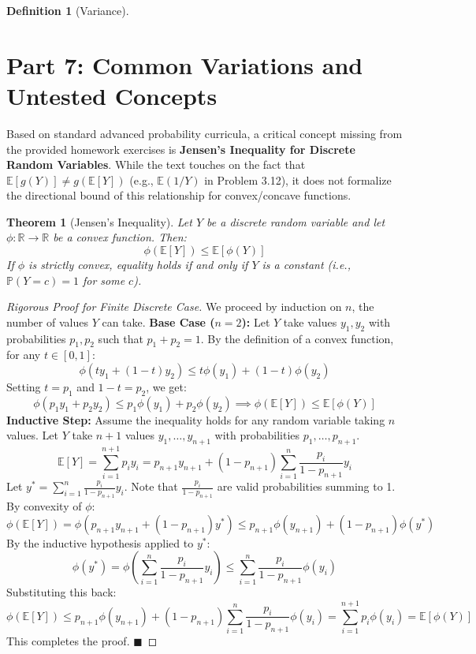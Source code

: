 \documentclass[11pt,letterpaper]{article}
\theoremstyle{definition}
\newtheorem{definition}{Definition}[section]
\theoremstyle{plain}
\newtheorem{theorem}{Theorem}[section]
\theoremstyle{remark}
\newcommand{\E}{\mathbb{E}}
\newcommand{\R}{\mathbb{R}}
\newcommand{\Prob}{\mathbb{P}}
\begin{document}
\begin{definition}[Variance]
\newpage
\section{Part 7: Common Variations and Untested Concepts}

Based on standard advanced probability curricula, a critical concept missing from the provided homework exercises is \textbf{Jensen's Inequality for Discrete Random Variables}. While the text touches on the fact that $\E[g(Y)] \neq g(\E[Y])$ (e.g., $\E(1/Y)$ in Problem 3.12), it does not formalize the directional bound of this relationship for convex/concave functions.

\begin{theorem}[Jensen's Inequality]
Let $Y$ be a discrete random variable and let $\phi: \R \to \R$ be a convex function. Then:
\[ \phi(\E[Y]) \le \E[\phi(Y)] \]
If $\phi$ is strictly convex, equality holds if and only if $Y$ is a constant (i.e., $\Prob(Y = c) = 1$ for some $c$).
\end{theorem}

\begin{proof}[Rigorous Proof for Finite Discrete Case]
We proceed by induction on $n$, the number of values $Y$ can take.
\textbf{Base Case ($n=2$):} Let $Y$ take values $y_1, y_2$ with probabilities $p_1, p_2$ such that $p_1 + p_2 = 1$.
By the definition of a convex function, for any $t \in [0,1]$:
\[ \phi(t y_1 + (1-t) y_2) \le t \phi(y_1) + (1-t) \phi(y_2) \]
Setting $t = p_1$ and $1-t = p_2$, we get:
\[ \phi(p_1 y_1 + p_2 y_2) \le p_1 \phi(y_1) + p_2 \phi(y_2) \implies \phi(\E[Y]) \le \E[\phi(Y)] \]
\textbf{Inductive Step:} Assume the inequality holds for any random variable taking $n$ values. Let $Y$ take $n+1$ values $y_1, \dots, y_{n+1}$ with probabilities $p_1, \dots, p_{n+1}$.
\[ \E[Y] = \sum_{i=1}^{n+1} p_i y_i = p_{n+1} y_{n+1} + (1 - p_{n+1}) \sum_{i=1}^n \frac{p_i}{1 - p_{n+1}} y_i \]
Let $y^* = \sum_{i=1}^n \frac{p_i}{1 - p_{n+1}} y_i$. Note that $\frac{p_i}{1 - p_{n+1}}$ are valid probabilities summing to 1.
By convexity of $\phi$:
\[ \phi(\E[Y]) = \phi(p_{n+1} y_{n+1} + (1 - p_{n+1}) y^*) \le p_{n+1} \phi(y_{n+1}) + (1 - p_{n+1}) \phi(y^*) \]
By the inductive hypothesis applied to $y^*$:
\[ \phi(y^*) = \phi\left( \sum_{i=1}^n \frac{p_i}{1 - p_{n+1}} y_i \right) \le \sum_{i=1}^n \frac{p_i}{1 - p_{n+1}} \phi(y_i) \]
Substituting this back:
\[ \phi(\E[Y]) \le p_{n+1} \phi(y_{n+1}) + (1 - p_{n+1}) \sum_{i=1}^n \frac{p_i}{1 - p_{n+1}} \phi(y_i) = \sum_{i=1}^{n+1} p_i \phi(y_i) = \E[\phi(Y)] \]
This completes the proof. $\blacksquare$
\end{proof}


\end{definition}
\end{document}
